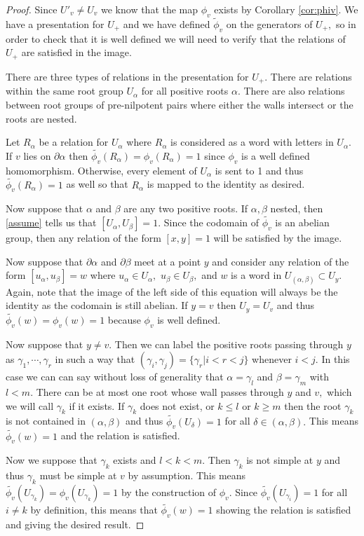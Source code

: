 \documentclass[class=book, crop=false,12 pt]{standalone}
\begin{document}
\begin{proof}
	Since $U'_v\neq U_v$ we know that the map $\phi_v$ exists by Corollary \ref{cor:phiv}. We have a presentation for $U_+$ and we have defined $\tilde{\phi}_v$ on the generators of $U_+,$ so in order to check that it is well defined we will need to verify that the relations of $U_+$ are satisfied in the image.

	There are three types of relations in the presentation for $U_+.$ There are relations within the same root group $U_\alpha$ for all positive roots $\alpha.$ There are also relations between root groups of pre-nilpotent pairs where either the walls intersect or the roots are nested.

	Let $R_\alpha$ be a relation for $U_\alpha$ where $R_\alpha$ is considered as a word with letters in $U_\alpha.$ If $v$ lies on $\partial \alpha$ then $\tilde{\phi_v}(R_\alpha)=\phi_v(R_\alpha)=1$ since $\phi_v$ is a well defined homomorphism. Otherwise, every element of $U_\alpha$ is sent to 1 and thus $\tilde{\phi_v}(R_\alpha)=1$ as well so that $R_\alpha$ is mapped to the identity as desired.

	Now suppose that $\alpha$ and $\beta$ are any two positive roots. If $\alpha,\beta$ nested, then \eqref{assume} tells us that $[U_\alpha,U_\beta]=1.$ Since the codomain of $\tilde{\phi_v}$ is an abelian group, then any relation of the form $[x,y]=1$ will be satisfied by the image.


	Now suppose that $\partial \alpha$ and $\partial \beta$ meet at a point $y$ and consider any relation of the form $[u_\alpha,u_\beta]=w$ where $u_\alpha\in U_\alpha,$ $u_\beta\in U_\beta,$ and $w$ is a word in $U_{(\alpha,\beta)}\subset U_y.$ Again, note that the image of the left side of this equation will always be the identity as the codomain is still abelian. If $y=v$ then $U_y=U_v$ and thus $\tilde{\phi_v}(w)=\phi_v(w)=1$ because $\phi_v$ is well defined.

	Now suppose that $y\neq v.$ Then we can label the positive roots passing through $y$ as $\gamma_1,\cdots,\gamma_r$ in such a way that $(\gamma_i,\gamma_j)=\{\gamma_{r}|i<r<j\}$ whenever $i<j.$ In this case we can can say without loss of generality that $\alpha=\gamma_l$ and $\beta=\gamma_m$ with $l<m.$  There can be at most one root whose wall passes through $y$ and $v,$ which we will call $\gamma_k$ if it exists. If $\gamma_k$ does not exist, or $k\le l$ or $k\ge m$ then the root $\gamma_k$ is not contained in $(\alpha,\beta)$ and thus $\tilde{\phi_v}(U_\delta)=1$ for all $\delta\in (\alpha,\beta).$ This means $\tilde{\phi_v}(w)=1$ and the relation is satisfied.

	Now we suppose that $\gamma_k$ exists and $l<k<m.$ Then $\gamma_k$ is not simple at $y$ and thus $\gamma_k$ must be simple at $v$ by assumption. This means $\tilde{\phi_v}(U_{\gamma_k})=\phi_v(U_{\gamma_k})=1$ by the construction of $\phi_v.$ Since $\tilde{\phi_v}(U_{\gamma_i})=1$ for all $i\neq k$ by definition, this means that $\tilde{\phi_v}(w)=1$ showing the relation is satisfied and giving the desired result.
\end{proof}
\end{document}
